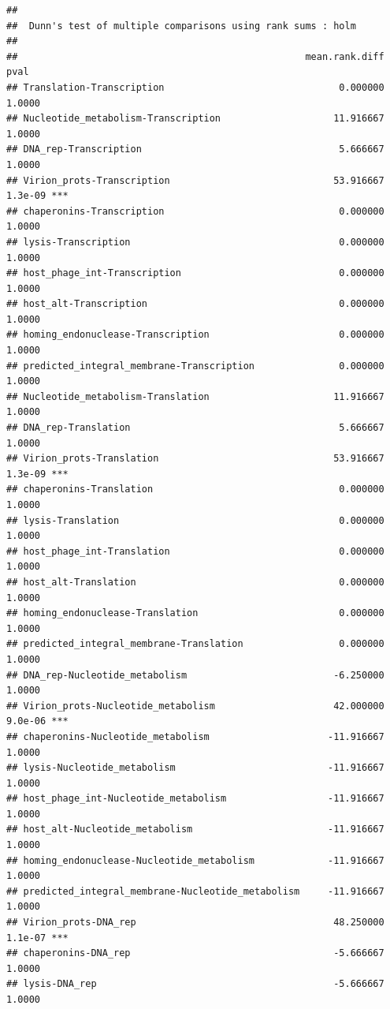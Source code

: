 \documentclass[
]{article}
\begin{document}
\begin{verbatim}
## 
##  Dunn's test of multiple comparisons using rank sums : holm  
## 
##                                                   mean.rank.diff    pval    
## Translation-Transcription                               0.000000  1.0000    
## Nucleotide_metabolism-Transcription                    11.916667  1.0000    
## DNA_rep-Transcription                                   5.666667  1.0000    
## Virion_prots-Transcription                             53.916667 1.3e-09 ***
## chaperonins-Transcription                               0.000000  1.0000    
## lysis-Transcription                                     0.000000  1.0000    
## host_phage_int-Transcription                            0.000000  1.0000    
## host_alt-Transcription                                  0.000000  1.0000    
## homing_endonuclease-Transcription                       0.000000  1.0000    
## predicted_integral_membrane-Transcription               0.000000  1.0000    
## Nucleotide_metabolism-Translation                      11.916667  1.0000    
## DNA_rep-Translation                                     5.666667  1.0000    
## Virion_prots-Translation                               53.916667 1.3e-09 ***
## chaperonins-Translation                                 0.000000  1.0000    
## lysis-Translation                                       0.000000  1.0000    
## host_phage_int-Translation                              0.000000  1.0000    
## host_alt-Translation                                    0.000000  1.0000    
## homing_endonuclease-Translation                         0.000000  1.0000    
## predicted_integral_membrane-Translation                 0.000000  1.0000    
## DNA_rep-Nucleotide_metabolism                          -6.250000  1.0000    
## Virion_prots-Nucleotide_metabolism                     42.000000 9.0e-06 ***
## chaperonins-Nucleotide_metabolism                     -11.916667  1.0000    
## lysis-Nucleotide_metabolism                           -11.916667  1.0000    
## host_phage_int-Nucleotide_metabolism                  -11.916667  1.0000    
## host_alt-Nucleotide_metabolism                        -11.916667  1.0000    
## homing_endonuclease-Nucleotide_metabolism             -11.916667  1.0000    
## predicted_integral_membrane-Nucleotide_metabolism     -11.916667  1.0000    
## Virion_prots-DNA_rep                                   48.250000 1.1e-07 ***
## chaperonins-DNA_rep                                    -5.666667  1.0000    
## lysis-DNA_rep                                          -5.666667  1.0000    

\end{verbatim}
\end{document}

